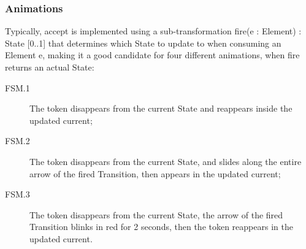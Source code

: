 \subsubsection{Animations}
\label{sec:Examples:FSM:Animations}

Typically, \textsf{accept} is implemented using a sub-transformation 
\textsf{fire(e : Element) : State [0..1]} that determines which \textsf{State} 
to update to when consuming an \textsf{Element} \textsf{e}, making it a good 
candidate for four different animations, when \textsf{fire} returns an actual 
\textsf{State}:
\begin{description}
   \item[FSM.1] The token disappears from the \textsf{current} \textsf{State} and
   reappears inside the updated \textsf{current};
   \item[FSM.2] The token disappears from the \textsf{current} \textsf{State}, and
   slides along the entire arrow of the fired \textsf{Transition}, then appears in
   the updated \textsf{current};
   \item[FSM.3] The token disappears from the \textsf{current} \textsf{State}, the
   arrow of the fired \textsf{Transition} blinks in red for 2 seconds, then the 
   token reappears in the updated \textsf{current}.
\end{description}


